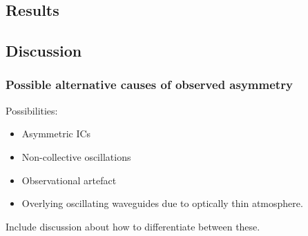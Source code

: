 \documentclass[12pt]{../style-files/ociamthesis}
\begin{document}
\subsection{Results}


\subsection{Discussion}

\subsubsection{Possible alternative causes of observed asymmetry}
Possibilities: 
\begin{itemize}
	\item Asymmetric ICs
	\item Non-collective oscillations
	\item Observational artefact
	\item Overlying oscillating waveguides due to optically thin atmosphere.
\end{itemize}
Include discussion about how to differentiate between these.





  
\end{document}
